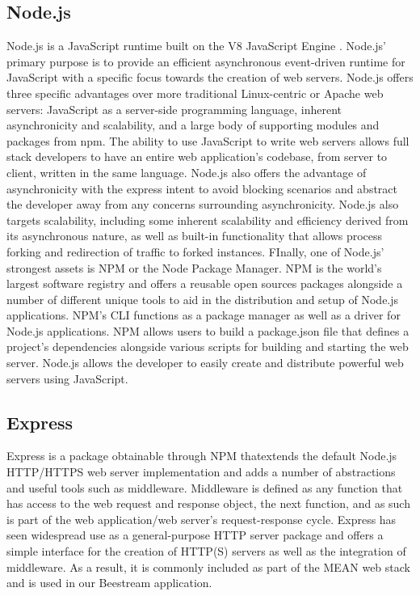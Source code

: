 \subsection{Node.js}
Node.js is a JavaScript runtime built on the V8 JavaScript Engine \cite{node}.  Node.js’ primary purpose is to provide an efficient asynchronous event-driven runtime for JavaScript with a specific focus towards the creation of web servers.  Node.js offers three specific advantages over more traditional Linux-centric or Apache web servers: JavaScript as a server-side programming language, inherent asynchronicity and scalability, and a large body of supporting modules and packages from npm.  The ability to use JavaScript to write web servers allows full stack developers to have an entire web application’s codebase, from server to client, written in the same language.  Node.js also offers the advantage of asynchronicity with the express intent to avoid blocking scenarios and abstract the developer away from any concerns surrounding asynchronicity.  Node.js also targets scalability, including some inherent scalability and  efficiency derived from its asynchronous nature, as well as built-in functionality that allows process forking and redirection of traffic to forked instances.  FInally, one of Node.js’ strongest assets is NPM or the Node Package Manager.  NPM is the world’s largest software registry \cite{npm} and offers a reusable open sources packages alongside a number of different unique tools to aid in the distribution and setup of Node.js applications.  NPM’s CLI functions as a package manager as well as a driver for Node.js applications.  NPM  allows users to build a package.json file that defines a project’s dependencies alongside various scripts for building and starting the web server.  Node.js allows the developer to easily create and distribute powerful web servers using JavaScript. \par

\subsection{Express}
Express \cite{express} is a package obtainable through NPM thatextends the default Node.js HTTP/HTTPS web server implementation and adds a number of abstractions and useful tools such as middleware.  Middleware is defined as any function that has access to the web request and response object, the next function, and as such is part of the web application/web server’s request-response cycle.  Express has seen widespread use as  a general-purpose HTTP server package and offers a simple interface for the creation of HTTP(S) servers as well as the integration of middleware.  As a result, it is commonly included as part of the MEAN web stack and is used in our Beestream application. \par

